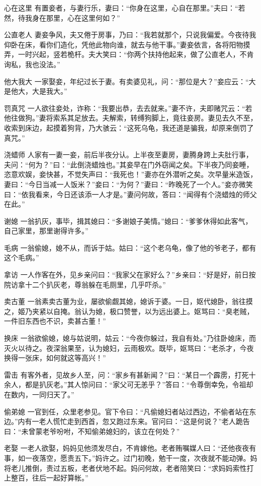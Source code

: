 \documentclass[12pt,UTF8]{ctexbook}
\begin{document}
心在这里
有置妾者，与妻行乐，妻曰：“你身在这里，心自在那里。”夫曰：“若然，待我身在那里，心在这里何如？”

公直老人
妻妾争风，夫又倦于房事，乃曰：“我若就那个，只说我偏爱。今夜待我仰卧在床，看你们造化，凭他此物向谁，就去与他干事。”妻妾依言，各将阳物摸弄，一时兴起，竖若桅杆。夫大笑曰：“你两个扶持他起来，做了公直老人，不肯询私，我也没法。”

他大我大
一家娶妾，年纪过长于妻。有卖婆见礼，问：“那位是大？”妾应云：“大是他大，大是我大。”

罚真咒
一人欲往妾处，诈称：“我要出恭，去去就来。”妻不许，夫即赌咒云：“若他往做狗。”妻将索系其足放去。夫解索，转缚狗脚上，竟往妾房。妻见去久不至，收索到床边，起摸着狗背，乃大骇云：“这死乌龟，我还道是骗我，却原来倒罚了真咒。”

浇蜡师
人家有一妻一妾，前后半夜分认。上半夜至妻房，妻腾身跨上夫肚行事，夫问：“何为？”曰：“此倒浇蜡烛也。”其妾早在门外窃闻之矣。下半夜乃同妾睡，恣意欢娱，妾快甚，不觉失声曰：“我死也！”妻亦在外潜听之矣。次早量米造饭，妻曰：“今日当减一人饭米？”妾曰：“为何？”妻曰：“昨晚死了一个人。”妾亦微笑曰：“依我看来，今日还该添一人才是。”妻问何故，答曰：“闻得有个浇蜡烛的师父在此。”

谢媳
一翁扒灰，事毕，揖其媳曰：“多谢娘子美情。”媳曰：“爹爹休得如此客气，自己家里，那里谢得许多。”

毛病
一翁偷媳，媳不从，而诉于姑。姑曰：“这个老乌龟，像了他的爷老子，都有这个毛病。”

拿访
一人作客在外，见乡亲问曰：“我家父在家好么？”乡亲曰：“好是好，前日按院访拿十二个扒灰老，尊翁躲在毛厕里，几乎吓杀。”

卖古董
一翁素卖古董为业，屡欲偷觑其媳，媳诉于婆。一日，妪代媳卧，翁往摸之，姬乃夹紧以自掩。翁认为媳，极口赞誉，以为远出婆上。妪骂曰：“臭老贼，一件旧东西也不识，卖甚古董！”

换床
一翁欲偷媳，媳与姑说明，姑云：“今夜你躲过，我自有处。”乃往卧媳床，而灭火以待之。夜深翁果至，认为媳妇，云雨极欢。既毕，妪骂曰：“老杀才，今夜换得一张床，如何就这等高兴！”

雷击
有客外者，见故乡人至，问：“家乡有甚新闻？”曰：“某日一个霹雳，打死十余人，都是扒灰老。”其人惊问曰：“家父可无恙乎？”答曰：“令尊倒幸免，令祖却在数内，一同归天了。”

偷弟媳
一官到任，众里老参见。官下令曰：“凡偷媳妇者站过西边，不偷者站在东边。”内有一老人慌忙走到西首，忽又跑过东来。官问曰：“这是何说？”老人跪告曰：“未曾蒙老爷吩咐，不知偷弟媳妇的，该立在何处？”

老娶
一老人欲娶，妈妈见他须发尽白，不肯嫁他。老者贿嘱媒人曰：“还他夜夜有事，如一夜落空，愿责五下。”妈许之。过门初晚，勉干一度，次夜就不能动弹。妈将老儿推倒，责过五板，老者伏地不起。妈问何故，老者陪笑曰：“求妈妈索性打上整百，往后一起好算帐。”
\end{document}
